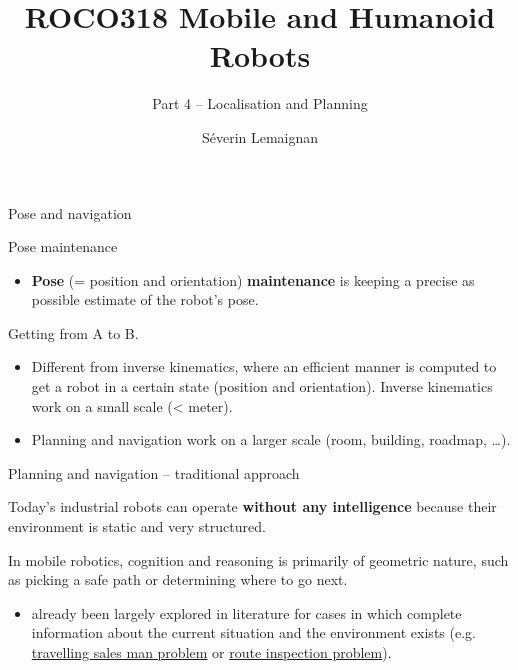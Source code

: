 \documentclass[compress]{beamer}
\title{ROCO318 \newline Mobile and Humanoid Robots}
\subtitle{Part 4 -- Localisation and Planning}
\date{}
\author{Séverin Lemaignan}
\institute{Centre for Neural Systems and Robotics\\{\bf Plymouth University}}
\begin{document}

\maketitle

\begin{frame}{Pose and navigation}

Pose maintenance

\begin{itemize}
\item \textbf{Pose} (= position and orientation) \textbf{maintenance} is
  keeping a precise as possible estimate of the robot's pose.
\end{itemize}

Getting from A to B.

\begin{itemize}
\item Different from inverse kinematics, where an efficient manner is
  computed to get a robot in a certain state (position and orientation).
  Inverse kinematics work on a small scale (\textless{} meter).
\item Planning and navigation work on a larger scale (room, building,
  roadmap, \ldots{}).
\end{itemize}

\end{frame}

\begin{frame}{Planning and navigation -- traditional approach}

Today's industrial robots can operate \textbf{without any intelligence} because
their environment is static and very structured.

In mobile robotics, cognition and reasoning is primarily of geometric
nature, such as picking a safe path or determining where to go next.

\begin{itemize}
\item already been largely explored in literature for cases in which
  complete information about the current situation and the environment
  exists (e.g.
  \href{http://en.wikipedia.org/wiki/Travelling_salesman_problem}{travelling
  sales man problem} or
  \href{http://en.wikipedia.org/wiki/Route_inspection_problem}{route
  inspection problem}).
\end{itemize}

\end{frame}
\end{document}
